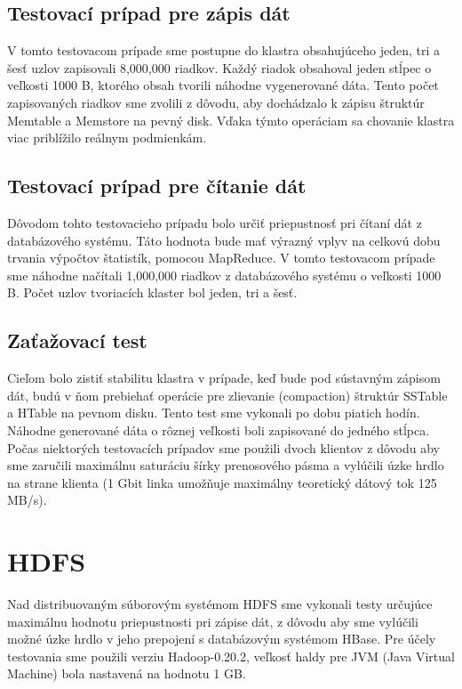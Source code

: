 \documentclass[11pt,twoside,a4paper]{book}
\begin{document}
\subsection{Testovací prípad pre zápis dát}

V tomto testovacom prípade sme postupne do klastra obsahujúceho jeden, tri a šesť uzlov zapisovali 8,000,000 riadkov. Každý riadok obsahoval jeden stĺpec o veľkosti 1000 B, ktorého obsah tvorili náhodne vygenerované dáta. Tento počet zapisovaných riadkov sme zvolili z dôvodu, aby dochádzalo k zápisu štruktúr Memtable a Memstore na pevný disk. Vďaka týmto operáciam sa chovanie klastra viac priblížilo reálnym podmienkám.

\subsection{Testovací prípad pre čítanie dát}

Dôvodom tohto testovacieho prípadu bolo určiť priepustnosť pri čítaní dát z databázového systému. Táto hodnota bude mať výrazný vplyv na celkovú dobu trvania výpočtov štatistík, pomocou MapReduce. V tomto testovacom prípade sme náhodne načítali 1,000,000 riadkov z databázového systému o veľkosti 1000 B. Počet uzlov tvoriacích klaster bol jeden, tri a šesť.

\subsection{Zaťažovací test}

Cieľom bolo zistiť stabilitu klastra v prípade, keď bude pod sústavným zápisom dát, budú v ňom prebiehať  operácie pre zlievanie (compaction) štruktúr SSTable a HTable na pevnom disku. Tento test sme vykonali po dobu piatich hodín. Náhodne generované dáta o rôznej veľkosti boli zapisované do jedného stĺpca. Počas niektorých testovacích prípadov sme použili dvoch klientov z dôvodu aby sme zaručili maximálnu saturáciu šírky prenosového pásma a vylúčili úzke hrdlo na strane klienta (1 Gbit linka umožňuje maximálny teoretický dátový tok 125 MB/s).


\section{HDFS}
Nad distribuovaným súborovým systémom HDFS sme vykonali testy určujúce maximálnu hodnotu priepustnosti pri zápise dát, z dôvodu aby sme vylúčili možné úzke hrdlo v jeho prepojení s databázovým systémom HBase. Pre účely testovania sme použili verziu Hadoop-0.20.2, veľkosť haldy pre JVM (Java Virtual Machine) bola nastavená na hodnotu 1 GB.
\end{document}
